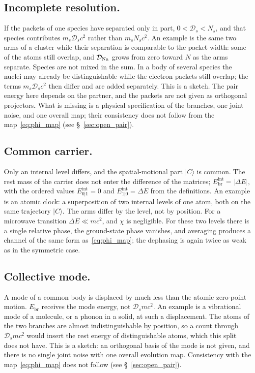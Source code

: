\documentclass[11pt,a4paper]{article}
\begin{document}
\subsection{Incomplete resolution.}
If the packets of one species have separated only in part, $0<\mathcal D_s<N_s$, and that species contributes $m_s\mathcal D_s c^2$ rather than $m_s N_s c^2$. An example is the same two arms of a cluster while their separation is comparable to the packet width: some of the atoms still overlap, and $\mathcal D_{\rm Na}$ grows from zero toward $N$ as the arms separate. Species are not mixed in the sum. In a body of several species the nuclei may already be distinguishable while the electron packets still overlap; the terms $m_s\mathcal D_s c^2$ then differ and are added separately. This is a sketch. The pair energy here depends on the partner, and the packets are not given as orthogonal projectors. What is missing is a physical specification of the branches, one joint noise, and one overall map; their consistency does not follow from the map~\eqref{eq:phi_map} (see \S~\ref{sec:open_pair}).

\subsection{Common carrier.}
Only an internal level differs, and the spatial-motional part $|C\rangle$ is common. The rest mass of the carrier does not enter the difference of the matrices; $E_{\mathrm{br}}^{\mathrm{int}}=|\Delta E|$, with the ordered values $E_{0|1}^{\mathrm{int}}=0$ and $E_{1|0}^{\mathrm{int}}=\Delta E$ from the definitions. An example is an atomic clock: a superposition of two internal levels of one atom, both on the same trajectory $|C\rangle$. The arms differ by the level, not by position. For a microwave transition $\Delta E\ll mc^2$, and $\chi$ is negligible. For these two levels there is a single relative phase, the ground-state phase vanishes, and averaging produces a channel of the same form as~\eqref{eq:phi_map}; the dephasing is again twice as weak as in the symmetric case.

\subsection{Collective mode.}
A mode of a common body is displaced by much less than the atomic zero-point motion. $E_{\mathrm{br}}$ receives the mode energy, not $\mathcal D_s mc^2$. An example is a vibrational mode of a molecule, or a phonon in a solid, at such a displacement. The atoms of the two branches are almost indistinguishable by position, so a count through $\mathcal D_s mc^2$ would insert the rest energy of distinguishable atoms, which this split does not have. This is a sketch: an orthogonal basis of the mode is not given, and there is no single joint noise with one overall evolution map. Consistency with the map~\eqref{eq:phi_map} does not follow (see \S~\ref{sec:open_pair}).
\end{document}
